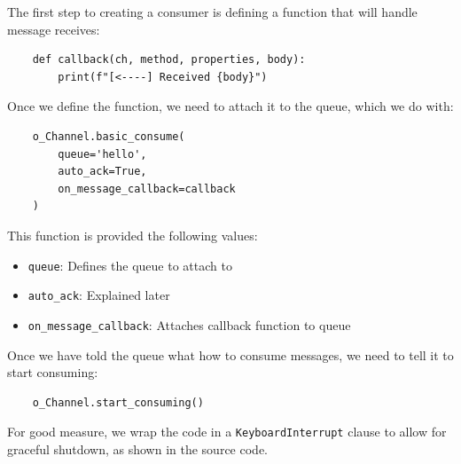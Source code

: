 \documentclass{article}
\begin{document}
The first step to creating a consumer is defining a function that will handle message receives:

\begin{verbatim}
    def callback(ch, method, properties, body):
        print(f"[<----] Received {body}")
\end{verbatim}

Once we define the function, we need to attach it to the queue, which we do with:

\begin{verbatim}
    o_Channel.basic_consume(
        queue='hello',
        auto_ack=True,
        on_message_callback=callback
    )
\end{verbatim}

This function is provided the following values:

\begin{itemize}
    \item \verb|queue|: Defines the queue to attach to
    \item \verb|auto_ack|: Explained later
    \item \verb|on_message_callback|: Attaches callback function to queue
\end{itemize}

Once we have told the queue what how to consume messages, we need to tell it to start consuming:

\begin{verbatim}
    o_Channel.start_consuming()
\end{verbatim}

For good measure, we wrap the code in a \verb|KeyboardInterrupt| clause to allow for graceful shutdown, as shown in the source code.
\end{document}
